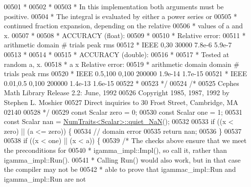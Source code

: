 \begin{DoxyCode}
00501 \textcolor{comment}{     *}
00502 \textcolor{comment}{     *}
00503 \textcolor{comment}{     * In this implementation both arguments must be positive.}
00504 \textcolor{comment}{     * The integral is evaluated by either a power series or}
00505 \textcolor{comment}{     * continued fraction expansion, depending on the relative}
00506 \textcolor{comment}{     * values of a and x.}
00507 \textcolor{comment}{     *}
00508 \textcolor{comment}{     * ACCURACY (float):}
00509 \textcolor{comment}{     *}
00510 \textcolor{comment}{     *                      Relative error:}
00511 \textcolor{comment}{     * arithmetic   domain     # trials      peak         rms}
00512 \textcolor{comment}{     *    IEEE      0,30        30000       7.8e-6      5.9e-7}
00513 \textcolor{comment}{     *}
00514 \textcolor{comment}{     *}
00515 \textcolor{comment}{     * ACCURACY (double):}
00516 \textcolor{comment}{     *}
00517 \textcolor{comment}{     * Tested at random a, x.}
00518 \textcolor{comment}{     *                a         x                      Relative error:}
00519 \textcolor{comment}{     * arithmetic   domain   domain     # trials      peak         rms}
00520 \textcolor{comment}{     *    IEEE     0.5,100   0,100      200000       1.9e-14     1.7e-15}
00521 \textcolor{comment}{     *    IEEE     0.01,0.5  0,100      200000       1.4e-13     1.6e-15}
00522 \textcolor{comment}{     *}
00523 \textcolor{comment}{     */}
00524     \textcolor{comment}{/*}
00525 \textcolor{comment}{      Cephes Math Library Release 2.2: June, 1992}
00526 \textcolor{comment}{      Copyright 1985, 1987, 1992 by Stephen L. Moshier}
00527 \textcolor{comment}{      Direct inquiries to 30 Frost Street, Cambridge, MA 02140}
00528 \textcolor{comment}{    */}
00529     \textcolor{keyword}{const} Scalar zero = 0;
00530     \textcolor{keyword}{const} Scalar one = 1;
00531     \textcolor{keyword}{const} Scalar nan = \hyperlink{group___core___module_struct_eigen_1_1_num_traits}{NumTraits<Scalar>::quiet\_NaN}();
00532 
00533     \textcolor{keywordflow}{if} ((x < zero) || (a <= zero)) \{
00534       \textcolor{comment}{// domain error}
00535       \textcolor{keywordflow}{return} nan;
00536     \}
00537 
00538     \textcolor{keywordflow}{if} ((x < one) || (x < a)) \{
00539       \textcolor{comment}{/* The checks above ensure that we meet the preconditions for}
00540 \textcolor{comment}{       * igamma\_impl::Impl(), so call it, rather than igamma\_impl::Run().}
00541 \textcolor{comment}{       * Calling Run() would also work, but in that case the compiler may not be}
00542 \textcolor{comment}{       * able to prove that igammac\_impl::Run and igamma\_impl::Run are not}

\end{DoxyCode}

